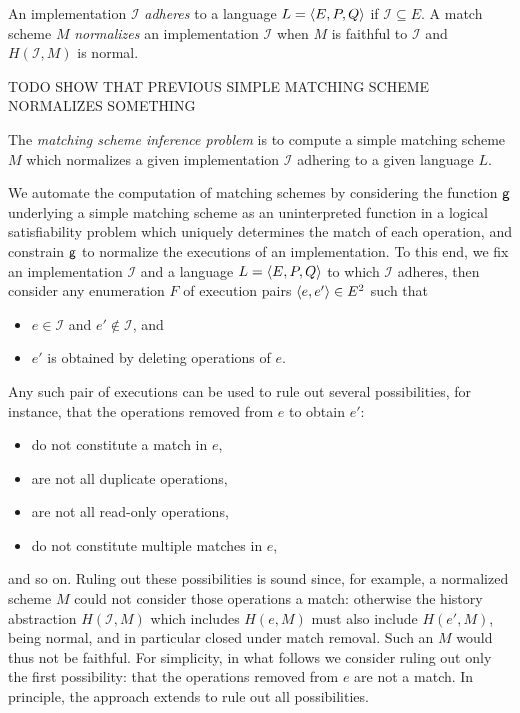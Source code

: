 An implementation $\mathcal{I}$ \emph{adheres} to a language $L = {\left\langle{E,P,Q}\right\rangle}$
if $\mathcal{I} \subseteq E$. A match scheme $M$ \emph{normalizes} an
implementation $\mathcal{I}$ when $M$ is faithful to $\mathcal{I}$ and
$H(\mathcal{I},M)$ is normal.

\begin{example}

  TODO SHOW THAT PREVIOUS SIMPLE MATCHING SCHEME NORMALIZES SOMETHING

\end{example}

\begin{definition}

  The \emph{matching scheme inference problem} is to compute a simple matching
  scheme $M$ which normalizes a given implementation $\mathcal{I}$ adhering to
  a given language $L$.

\end{definition}

We automate the computation of matching schemes by considering the function
${\sf g}$ underlying a simple matching scheme as an uninterpreted function in a
logical satisfiability problem which uniquely determines the match of each
operation, and constrain ${\sf g}$ to normalize the executions of an
implementation. To this end, we fix an implementation $\mathcal{I}$ and a
language $L = {\left\langle{E,P,Q}\right\rangle}$ to which $\mathcal{I}$ adheres, then consider any
enumeration $F$ of execution pairs ${\left\langle{e,e'}\right\rangle} \in E^2$ such that
\begin{itemize}

  \item $e \in \mathcal{I}$ and $e' \not\in \mathcal{I}$, and

  \item $e'$ is obtained by deleting operations of $e$.

\end{itemize}
Any such pair of executions can be used to rule out several possibilities,
for instance, that the operations removed from $e$ to obtain $e'$:
\begin{itemize}

  \item do not constitute a match in $e$,

  \item are not all duplicate operations,

  \item are not all read-only operations,

  \item do not constitute multiple matches in $e$,

\end{itemize}
and so on. Ruling out these possibilities is sound since, for example, a
normalized scheme $M$ could not consider those operations a match: otherwise
the history abstraction $H(\mathcal{I},M)$ which includes $H(e,M)$ must also
include $H(e',M)$, being normal, and in particular closed under match removal.
Such an $M$ would thus not be faithful. For simplicity, in what follows we
consider ruling out only the first possibility: that the operations removed
from $e$ are not a match. In principle, the approach extends to rule out all
possibilities.

